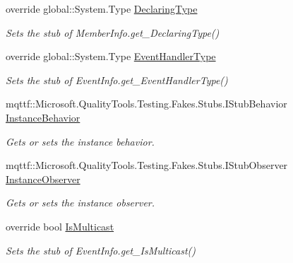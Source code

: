 \begin{DoxyCompactItemize}
override global\-::\-System.\-Type \hyperlink{class_system_1_1_reflection_1_1_fakes_1_1_stub_event_info_a358982cb962b34927626cc6d204354a6}{Declaring\-Type}
\begin{DoxyCompactList}\small\item\em Sets the stub of Member\-Info.\-get\-\_\-\-Declaring\-Type()\end{DoxyCompactList}\item 
override global\-::\-System.\-Type \hyperlink{class_system_1_1_reflection_1_1_fakes_1_1_stub_event_info_a6524ed454fce5bd281b24719829c206c}{Event\-Handler\-Type}
\begin{DoxyCompactList}\small\item\em Sets the stub of Event\-Info.\-get\-\_\-\-Event\-Handler\-Type()\end{DoxyCompactList}\item 
mqttf\-::\-Microsoft.\-Quality\-Tools.\-Testing.\-Fakes.\-Stubs.\-I\-Stub\-Behavior \hyperlink{class_system_1_1_reflection_1_1_fakes_1_1_stub_event_info_a9c46a3f1eb3fc612e861622fc6e3e76e}{Instance\-Behavior}
\begin{DoxyCompactList}\small\item\em Gets or sets the instance behavior.\end{DoxyCompactList}\item 
mqttf\-::\-Microsoft.\-Quality\-Tools.\-Testing.\-Fakes.\-Stubs.\-I\-Stub\-Observer \hyperlink{class_system_1_1_reflection_1_1_fakes_1_1_stub_event_info_ab80a03293626ba4eae00bff632b33f3f}{Instance\-Observer}
\begin{DoxyCompactList}\small\item\em Gets or sets the instance observer.\end{DoxyCompactList}\item 
override bool \hyperlink{class_system_1_1_reflection_1_1_fakes_1_1_stub_event_info_a444234212493c7f75a3227aa4a6a1148}{Is\-Multicast}
\begin{DoxyCompactList}\small\item\em Sets the stub of Event\-Info.\-get\-\_\-\-Is\-Multicast()\end{DoxyCompactList}\item 

\end{DoxyCompactItemize}
